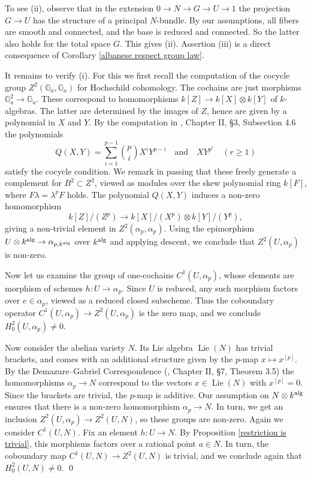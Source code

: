 \documentclass[oneside, 12pt]{amsart}
\theoremstyle{definition}
\theoremstyle{remark}
\newcommand{\GG}{\mathbb{G}}
\newcommand{\alg}{\text{\rm alg}}
\newcommand{\Lie}{\operatorname{Lie}}
\newcommand{\lra}{\longrightarrow}
\newcommand{\quadand}{\quad\text{and}\quad}
\newcommand{\ra}{\rightarrow}
\begin{document}
\proof
To see (ii), observe that in the extension $0\ra N\ra G\ra U\ra 1$ the projection $G\ra U$
has the structure of  a principal $N$-bundle. By our assumptions, all fibers are smooth and connected,
and the base is reduced and connected. So the latter also holds for the total space $G$. This gives (ii).
Assertion (iii) is a direct consequence of Corollary \ref{albanese respect group law}.

It remains to verify (i).
For this we first recall the computation of  the cocycle group  $Z^2(\GG_a,\GG_a)$ for Hochschild cohomology.
The cochains are just morphisms $\GG_a^2\ra\GG_a$. These correspond to homomorphisms
$k[Z]\ra k[X]\otimes k[Y]$ of $k$-algebras. The latter are determined by the images
of $Z$, hence are given by a polynomial in $X$ and $Y$.
By the computation in \cite{Demazure; Gabriel 1970}, Chapter II, \S3, Subsection 4.6
the polynomials
$$
Q(X,Y)=\sum_{i=1}^{p-1}\binom{p}{i} X^iY^{p-i}\quadand XY^{p^r} \quad (r\geq 1)
$$
satisfy the cocycle condition. We remark in passing that these freely generate a complement
for $B^2\subset Z^2$, viewed as modules over the skew polynomial ring $k[F]$, where $F\lambda=\lambda^pF$ holds.
The polynomial $Q(X,Y)$ induces a non-zero homomorphism
$$
k[Z]/(Z^p)\lra k[X]/(X^p)\otimes k[Y]/(Y^p),
$$
giving a non-trivial element in $Z^2(\alpha_p,\alpha_p)$.
Using  the epimorphism $U\otimes k^\alg\ra \alpha_{p,k^\alg}$ over $k^\alg$ and applying descent,
we conclude that $Z^2(U,\alpha_p)$ is non-zero. 

Now let us examine the group of one-cochains $C^1(U,\alpha_p)$, whose elements are morphism of schemes $h:U\ra\alpha_p$.
Since $U$ is reduced, any such morphism factors over  $e\in \alpha_p$, viewed as a reduced closed subscheme.
Thus the coboundary operator $C^1(U,\alpha_p)\ra Z^2(U,\alpha_p)$ is the zero map, and we conclude  $H^2_0(U,\alpha_p)\neq 0$.

Now consider the abelian variety $N$. Its Lie algebra $\Lie(N)$ has trivial brackets, and comes with an additional structure
given by the $p$-map $x\mapsto x^{[p]}$. By the Demazure--Gabriel Correspondence (\cite{Demazure; Gabriel 1970}, Chapter II, \S7, Theorem 3.5)
the homomorphisms
$\alpha_p\ra N$ correspond to the vectors $x\in \Lie(N)$ with $x^{[p]}=0$. Since the brackets are trivial, the $p$-map is additive.
 Our assumption on $N\otimes k^\alg$ ensures that
there is a non-zero homomorphism $\alpha_p\ra N$.
In turn, we get an inclusion $Z^2(U,\alpha_p)\ra Z^2(U,N)$, so these groups are non-zero.
Again we consider $C^1(U,N)$. Fix an element $h:U\ra N$. By Proposition \ref{restriction is trivial},
this morphisms factors over a rational point $a\in N$. In turn, the coboundary map $C^1(U,N)\ra Z^2(U,N)$ is trivial,
and we conclude again that $H^2_0(U,N)\neq 0$.
\qed
\end{document}
